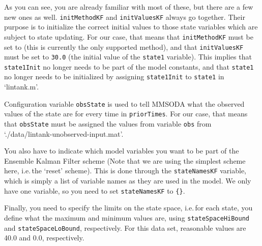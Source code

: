 As you can see, you are already familiar with most of these, but there are a few new ones as well. \texttt{initMethodKF} and \texttt{initValuesKF} always go together. Their purpose is to initialize the correct initial values to those state variables which are subject to state updating. For our case, that means that \texttt{initMethodKF} must be set to \texttt{} (this is currently the only supported method), and that \texttt{initValuesKF} must be set to \texttt{30.0} (the initial value of the \texttt{state1} variable). This implies that \texttt{state1Init} no longer needs to be part of the model constants, and that \texttt{state1} no longer needs to be initialized by assigning \texttt{state1Init}  to \texttt{state1} in `lintank.m'.

Configuration variable \texttt{obsState} is used to tell MMSODA what the observed values of the state are for every time in \texttt{priorTimes}. For our case, that means that \texttt{obsState} must be assigned the values from variable \texttt{obs} from `./data/lintank-unobserved-input.mat'.

You also have to indicate which model variables you want to be part of the Ensemble Kalman Filter scheme (Note that we are using the simplest scheme here, i.e.\,the `reset' scheme). This is done through the \texttt{stateNamesKF} variable, which is simply a list of variable names as they are used in the model. We only have one variable, so you need to set \texttt{stateNamesKF} to \texttt{\{\}}.

Finally, you need to specify the limits on the state space, i.e.\,for each state, you define what the maximum and minimum values are, using \texttt{stateSpaceHiBound} and \texttt{stateSpaceLoBound}, respectively. For this data set, reasonable values are 40.0 and 0.0, respectively.



